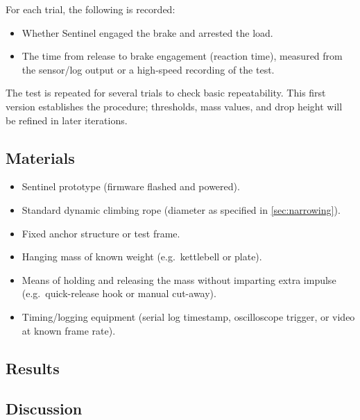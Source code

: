 For each trial, the following is recorded:

\begin{itemize}
    \item Whether Sentinel engaged the brake and arrested the load.
    \item The time from release to brake engagement (reaction time),
        measured from the sensor/log output or a high-speed recording of
        the test.
\end{itemize}

The test is repeated for several trials to check basic repeatability.
This first version establishes the procedure; thresholds, mass values, and
drop height will be refined in later iterations.

\subsection{Materials}
\label{sec:test1-materials}

\begin{itemize}
    \item Sentinel prototype (firmware flashed and powered).
    \item Standard dynamic climbing rope (diameter as specified in
        \cref{sec:narrowing}).
    \item Fixed anchor structure or test frame.
    \item Hanging mass of known weight (e.g.\ kettlebell or plate).
    \item Means of holding and releasing the mass without imparting extra
        impulse (e.g.\ quick-release hook or manual cut-away).
    \item Timing/logging equipment (serial log timestamp, oscilloscope
        trigger, or video at known frame rate).
\end{itemize}

\subsection{Results}
\label{sec:test1-results}


\subsection{Discussion}
\label{sec:test1-discussion}

